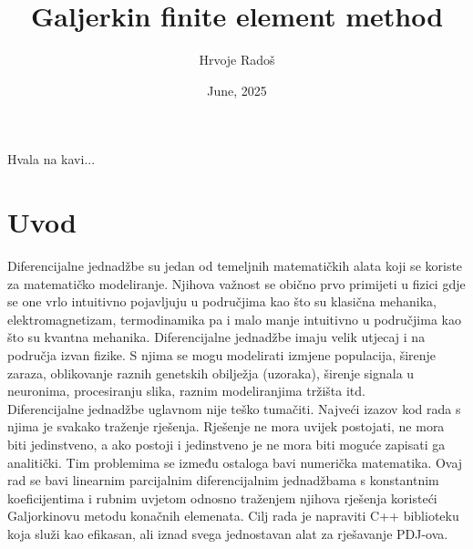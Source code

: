 \documentclass[zavrsnirad]{../fer}
\title{Galjerkin finite element method}
\author{Hrvoje Radoš}
\date{June, 2025}
\begin{document}
\maketitle






\begin{zahvale}
	Hvala na kavi...
\end{zahvale}


\mainmatter


\tableofcontents


\chapter{Uvod}
\label{pog:uvod}
Diferencijalne jednadžbe su jedan od temeljnih matematičkih
alata koji se koriste za matematičko modeliranje. Njihova
važnost se obično prvo primijeti u fizici gdje se one vrlo
intuitivno pojavljuju u područjima kao što su klasična mehanika,
elektromagnetizam, termodinamika pa i malo manje intuitivno u
područjima kao što su kvantna mehanika. Diferencijalne jednadžbe
imaju velik utjecaj i na područja izvan fizike.
S njima se mogu modelirati izmjene populacija, širenje zaraza,
oblikovanje raznih genetskih obilježja (uzoraka),
širenje signala u neuronima, procesiranju slika, raznim
modeliranjima tržišta itd.
\bigskip
\\
Diferencijalne jednadžbe uglavnom nije teško tumačiti. Najveći
izazov kod rada s njima je svakako traženje rješenja.
Rješenje ne mora uvijek postojati, ne mora biti jedinstveno,
a ako postoji i jedinstveno je ne mora biti moguće zapisati
ga analitički. Tim problemima se između ostaloga bavi numerička
matematika. Ovaj rad se bavi linearnim parcijalnim diferencijalnim
jednadžbama s konstantnim koeficijentima i rubnim uvjetom odnosno
traženjem njihova rješenja koristeći Galjorkinovu metodu
konačnih elemenata. Cilj rada je napraviti
C++ biblioteku koja služi kao efikasan, ali iznad svega
jednostavan alat za rješavanje PDJ-ova.
\end{document}
